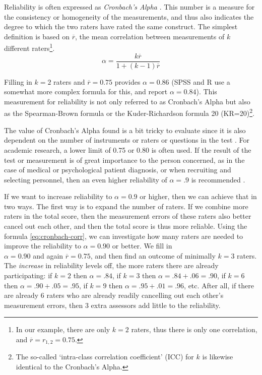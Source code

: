 \documentclass[
]{book}
\begin{document}
Reliability is often expressed as \emph{Cronbach's Alpha}
\citep{Cort93}. This number is a measure for the consistency or homogeneity
of the measurements, and thus also indicates the degree to which the two
raters have rated the same construct. The simplest definition is
based on \(\overline{r}\), the mean correlation between
measurements of \(k\) different raters\footnote{In our example, there are only \(k=2\) raters, thus there is only one
  correlation, and \(\overline{r} = r_{1,2} = 0.75\).}.
\begin{equation}
  \label{eq:cronbach-corr}
  \alpha = \frac{k \overline{r}} {1+(k-1)\overline{r}}
\end{equation}

Filling in \(k=2\) raters and \(\overline{r}=0.75\) provides \(\alpha=0.86\) (SPSS and R
use a somewhat more complex formula for this, and report
\(\alpha=0.84\)). This measurement for reliability is not only referred to
as Cronbach's Alpha but also as the Spearman-Brown formula
or the Kuder-Richardson formula 20 (KR=20)\footnote{The so-called `intra-class correlation coefficient' (ICC) for \(k\)
  is likewise identical to the Cronbach's Alpha.}.

The value of Cronbach's Alpha found is a bit tricky to evaluate
since it is also dependent on the number of instruments or raters or
questions in the test \citep{Cort93, Glin01}. For academic research,
a lower limit of 0.75 or 0.80 is often used. If the result of the test or measurement
is of great importance to the person concerned, as in the case of medical or
psychological patient diagnosis, or when recruiting and selecting personnel, then
an even higher reliability of \(\alpha=.9\) is recommended \citep{Glin01}.

If we want to increase reliability to \(\alpha=0.9\) or higher, then
we can achieve that in two ways. The first way is to expand the
number of raters. If we combine more raters in the total score,
then the measurement errors of these raters also better cancel out each other,
and then the total score is thus more reliable. Using
the formula \eqref{eq:cronbach-corr}, we can investigate how many raters
are needed to improve the reliability to \(\alpha=0.90\) or better. We fill in\\
\(\alpha=0.90\) and again \(\overline{r}=0.75\), and then find an outcome of
minimally \(k=3\) raters. The \emph{increase} in reliability levels off, the more
raters there are already participating: if \(k=2\) then \(\alpha=.84\), if \(k=3\) then
\(\alpha=.84+.06=.90\), if \(k=6\) then \(\alpha=.90+.05=.95\), if \(k=9\) then
\(\alpha=.95+.01=.96\), etc. After all, if there are already 6 raters who are
already readily cancelling out each other's measurement errors, then 3 extra
assessors add little to the reliability.
\end{document}
